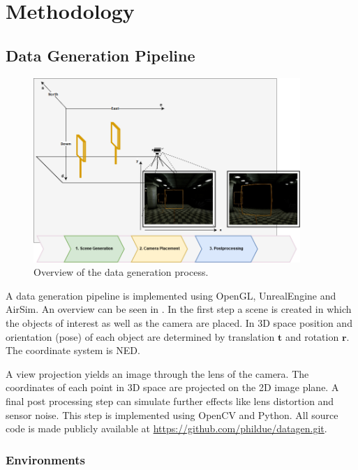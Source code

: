 \chapter{Methodology}

\section{Data Generation Pipeline}
\label{sec:datagen:method}
\begin{figure}[htbp]
	\centering
	\includegraphics[width=0.9\textwidth]{fig/datagen_notation}
	\caption{Overview of the data generation process.}
	\label{fig:training:datagen_notation}
\end{figure}

A data generation pipeline is implemented using OpenGL, UnrealEngine and AirSim. An overview can be seen in . In the first step a scene is created in which the objects of interest as well as the camera are placed. In 3D space position and orientation (pose) of each object are determined by translation $\textbf{t}$ and rotation $\textbf{r}$. The coordinate system is \ac{NED}.

A view projection yields an image through the lens of the camera. The coordinates of each point in 3D space are projected on the 2D image plane. A final post processing step can simulate further effects like lens distortion and sensor noise. This step is implemented using OpenCV and Python. All source code is made publicly available at \url{https://github.com/phildue/datagen.git}.

\subsection{Environments}

